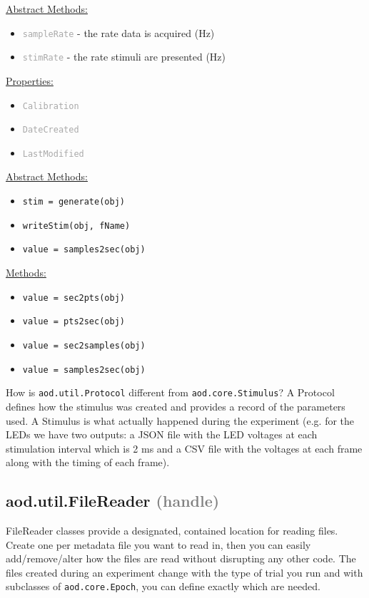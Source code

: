 \documentclass[10pt]{exam}
\newcommand\myparent[1]{\textcolor{gray}{(#1)}}
\newcommand\aodclass[1]{\textcolor{codeblue}{\texttt{#1}}}
\newcommand\aodprop[1]{\textcolor{darkgray}{\texttt{#1}}}
\newcommand\aodfcn[1]{\textcolor{darkteal}{\texttt{#1}}}
\newcommand\docheader[1]{\vspace{0.6ex}\noindent\underline{#1}\vspace{0.15ex}}
\begin{document}
		\docheader{Abstract Methods:}
		\begin{itemize}
			\item \aodprop{sampleRate} - the rate data is acquired (Hz)
			\item \aodprop{stimRate} - the rate stimuli are presented (Hz)
		\end{itemize}
		\docheader{Properties:}
		\begin{itemize}
			\item \aodprop{Calibration}
			\item \aodprop{DateCreated}
			\item \aodprop{LastModified}
		\end{itemize}
		\docheader{Abstract Methods:}
		\begin{itemize}
			\item \aodfcn{stim = generate(obj)}
			\item \aodfcn{writeStim(obj, fName)}
			\item \aodfcn{value = samples2sec(obj)}
		\end{itemize}
		\docheader{Methods:}
		\begin{itemize}
			\item \aodfcn{value = sec2pts(obj)}
			\item \aodfcn{value = pts2sec(obj)}
			\item \aodfcn{value = sec2samples(obj)}
			\item \aodfcn{value = samples2sec(obj)}
		\end{itemize}
		
		\noindent How is \aodclass{aod.util.Protocol} different from \aodclass{aod.core.Stimulus}? A Protocol defines how the stimulus was created and provides a record of the parameters used. A Stimulus is what actually happened during the experiment (e.g. for the LEDs we have two outputs: a JSON file with the LED voltages at each stimulation interval which is 2 ms and a CSV file with the voltages at each frame along with the timing of each frame). 
	
	\subsection{aod.util.FileReader \myparent{handle}}
		\label{subsection:FileReaderDoc}
		\noindent FileReader classes provide a designated, contained location for reading files. Create one per metadata file you want to read in, then you can easily add/remove/alter how the files are read without disrupting any other code. The files created during an experiment change with the type of trial you run and with subclasses of \aodclass{aod.core.Epoch}, you can define exactly which are needed. 
		
\end{document}
